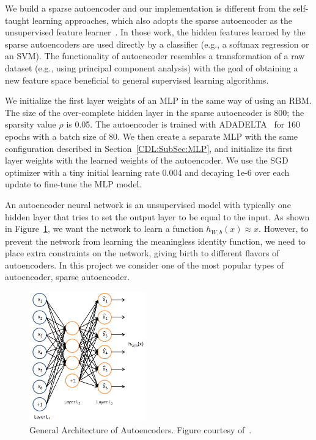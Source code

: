 We build a sparse autoencoder and our implementation is different from the
self-taught learning approaches, which also adopts the sparse autoencoder as the unsupervised feature learner~\cite{STL-NIDS, SparseAE}.
In those work, the hidden features learned by the sparse autoencoders are used directly by a classifier (e.g., a softmax regression or an SVM).
The functionality of autoencoder resembles a transformation of a raw dataset (e.g., using principal component analysis) with the goal of obtaining a new feature space beneficial to general supervised learning algorithms.

We initialize the first layer weights of an MLP in the same way of using an RBM.
The size of the over-complete hidden layer in the sparse autoencoder is 800; the sparsity value $\rho$ is 0.05.
The autoencoder is trained with ADADELTA~\cite{ADADELTA} for 160 epochs with a batch size of 80.
We then create a separate MLP with the same configuration described in Section~\ref{CDL:SubSec:MLP},
and initialize its first layer weights with the learned weights of the autoencoder.
We use the SGD optimizer with a tiny initial learning rate 0.004
and decaying 1e-6 over each update to fine-tune the MLP model.

\iffalse
An autoencoder neural network is an unsupervised model with typically one hidden layer that
tries to set the output layer to be equal to the input.
As shown in Figure~\ref{Fig:AEArchitecture}, we want the network to
learn a function $h_{W, b}(x) \approx x$.
However, to prevent the network from learning the meaningless identity function,
we need to place extra constraints on the network, giving birth to different
flavors of autoencoders.
In this project we consider one of the most popular types of autoencoder, sparse autoencoder.

\begin{figure}[h]
    \centering
    \includegraphics[width=0.45\textwidth]{figures/autoencoder.png}
    \caption{General Architecture of Autoencoders.
        Figure courtesy of~\cite{UFLDLAutoencoder}.}
    \label{Fig:AEArchitecture}
\end{figure}

